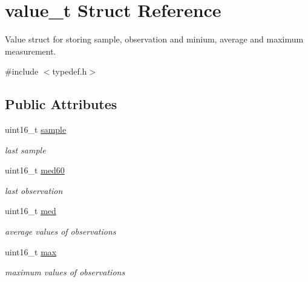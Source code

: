 \hypertarget{structvalue__t}{}\section{value\+\_\+t Struct Reference}
\label{structvalue__t}


Value struct for storing sample, observation and minium, average and maximum measurement.  




{\ttfamily \#include $<$typedef.\+h$>$}

\subsection*{Public Attributes}
\begin{DoxyCompactItemize}
\item 
\mbox{\label{structvalue__t_a55071948ced929ed25b6985855760c93}} 
uint16\+\_\+t \hyperlink{structvalue__t_a55071948ced929ed25b6985855760c93}{sample}
\begin{DoxyCompactList}\small\item\em last sample \end{DoxyCompactList}\item 
\mbox{\label{structvalue__t_aed8cf8ed89721e6413a8958e5652851c}} 
uint16\+\_\+t \hyperlink{structvalue__t_aed8cf8ed89721e6413a8958e5652851c}{med60}
\begin{DoxyCompactList}\small\item\em last observation \end{DoxyCompactList}\item 
\mbox{\label{structvalue__t_a10377d2bf0f09bf6bfdeea94dad0b49a}} 
uint16\+\_\+t \hyperlink{structvalue__t_a10377d2bf0f09bf6bfdeea94dad0b49a}{med}
\begin{DoxyCompactList}\small\item\em average values of observations \end{DoxyCompactList}\item 
\mbox{\label{structvalue__t_accfbbf359ab89ef4c4d81ab9520fe820}} 
uint16\+\_\+t \hyperlink{structvalue__t_accfbbf359ab89ef4c4d81ab9520fe820}{max}
\begin{DoxyCompactList}\small\item\em maximum values of observations \end{DoxyCompactList}\item 

\end{DoxyCompactItemize}
